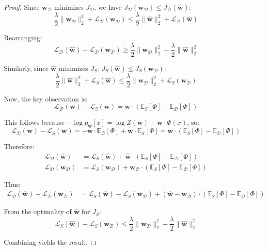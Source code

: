 \documentclass[letterpaper, 11pt]{article}
\newcommand{\1}{\mathds{1}}	%
\theoremstyle{definition}
\begin{document}
\begin{proof}
Since $\mathbf{w}_\mathcal{D}$ minimizes $J_\mathcal{D}$, we have $J_\mathcal{D}(\mathbf{w}_\mathcal{D}) \leq J_\mathcal{D}(\widehat{\mathbf{w}})$:
$$\frac{\lambda}{2}\|\mathbf{w}_\mathcal{D}\|_2^2 + \mathcal{L}_\mathcal{D}(\mathbf{w}_\mathcal{D}) \leq \frac{\lambda}{2}\|\widehat{\mathbf{w}}\|_2^2 + \mathcal{L}_\mathcal{D}(\widehat{\mathbf{w}})$$

Rearranging:
$$\mathcal{L}_\mathcal{D}(\widehat{\mathbf{w}}) - \mathcal{L}_\mathcal{D}(\mathbf{w}_\mathcal{D}) \geq \frac{\lambda}{2}\|\mathbf{w}_\mathcal{D}\|_2^2 - \frac{\lambda}{2}\|\widehat{\mathbf{w}}\|_2^2$$

Similarly, since $\widehat{\mathbf{w}}$ minimizes $J_S$: $J_S(\widehat{\mathbf{w}}) \leq J_S(\mathbf{w}_\mathcal{D})$:
$$\frac{\lambda}{2}\|\widehat{\mathbf{w}}\|_2^2 + \mathcal{L}_S(\widehat{\mathbf{w}}) \leq \frac{\lambda}{2}\|\mathbf{w}_\mathcal{D}\|_2^2 + \mathcal{L}_S(\mathbf{w}_\mathcal{D})$$

Now, the key observation is:
$$\mathcal{L}_\mathcal{D}(\mathbf{w}) - \mathcal{L}_S(\mathbf{w}) = \mathbf{w} \cdot \left(\mathbb{E}_S[\Phi] - \mathbb{E}_\mathcal{D}[\Phi]\right)$$

This follows because $-\log p_\mathbf{w}[x] = \log Z(\mathbf{w}) - \mathbf{w} \cdot \Phi(x)$, so:
$$\mathcal{L}_\mathcal{D}(\mathbf{w}) - \mathcal{L}_S(\mathbf{w}) = -\mathbf{w} \cdot \mathbb{E}_\mathcal{D}[\Phi] + \mathbf{w} \cdot \mathbb{E}_S[\Phi] = \mathbf{w} \cdot (\mathbb{E}_S[\Phi] - \mathbb{E}_\mathcal{D}[\Phi])$$

Therefore:
\begin{align*}
\mathcal{L}_\mathcal{D}(\widehat{\mathbf{w}}) &= \mathcal{L}_S(\widehat{\mathbf{w}}) + \widehat{\mathbf{w}} \cdot (\mathbb{E}_S[\Phi] - \mathbb{E}_\mathcal{D}[\Phi]) \\
\mathcal{L}_\mathcal{D}(\mathbf{w}_\mathcal{D}) &= \mathcal{L}_S(\mathbf{w}_\mathcal{D}) + \mathbf{w}_\mathcal{D} \cdot (\mathbb{E}_S[\Phi] - \mathbb{E}_\mathcal{D}[\Phi])
\end{align*}

Thus:
\begin{align*}
\mathcal{L}_\mathcal{D}(\widehat{\mathbf{w}}) - \mathcal{L}_\mathcal{D}(\mathbf{w}_\mathcal{D}) &= \mathcal{L}_S(\widehat{\mathbf{w}}) - \mathcal{L}_S(\mathbf{w}_\mathcal{D}) + (\widehat{\mathbf{w}} - \mathbf{w}_\mathcal{D}) \cdot (\mathbb{E}_S[\Phi] - \mathbb{E}_\mathcal{D}[\Phi])
\end{align*}

From the optimality of $\widehat{\mathbf{w}}$ for $J_S$:
$$\mathcal{L}_S(\widehat{\mathbf{w}}) - \mathcal{L}_S(\mathbf{w}_\mathcal{D}) \leq \frac{\lambda}{2}\|\mathbf{w}_\mathcal{D}\|_2^2 - \frac{\lambda}{2}\|\widehat{\mathbf{w}}\|_2^2$$

Combining yields the result.
\end{proof}
\end{document}
